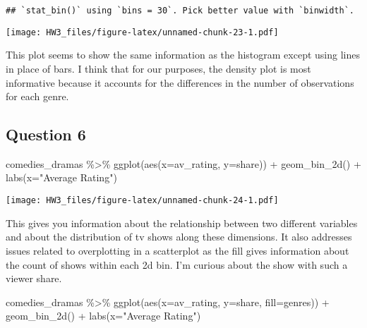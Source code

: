 \documentclass[
]{article}
\newenvironment{Shaded}{\begin{snugshade}}{\end{snugshade}}
\newcommand{\AttributeTok}[1]{\textcolor[rgb]{0.77,0.63,0.00}{#1}}
\newcommand{\FunctionTok}[1]{\textcolor[rgb]{0.00,0.00,0.00}{#1}}
\newcommand{\NormalTok}[1]{#1}
\newcommand{\SpecialCharTok}[1]{\textcolor[rgb]{0.00,0.00,0.00}{#1}}
\newcommand{\StringTok}[1]{\textcolor[rgb]{0.31,0.60,0.02}{#1}}
\begin{document}
\begin{verbatim}
## `stat_bin()` using `bins = 30`. Pick better value with `binwidth`.
\end{verbatim}

\texttt{[image: HW3\_files/figure-latex/unnamed-chunk-23-1.pdf]}

This plot seems to show the same information as the histogram except
using lines in place of bars. I think that for our purposes, the density
plot is most informative because it accounts for the differences in the
number of observations for each genre.

\hypertarget{question-6-1}{%
\subsection{Question 6}\label{question-6-1}}

\begin{Shaded}
\begin{Highlighting}[]
\NormalTok{comedies\_dramas }\SpecialCharTok{\%\textgreater{}\%} 
  \FunctionTok{ggplot}\NormalTok{(}\FunctionTok{aes}\NormalTok{(}\AttributeTok{x=}\NormalTok{av\_rating, }\AttributeTok{y=}\NormalTok{share)) }\SpecialCharTok{+}
  \FunctionTok{geom\_bin\_2d}\NormalTok{() }\SpecialCharTok{+} 
  \FunctionTok{labs}\NormalTok{(}\AttributeTok{x=}\StringTok{"Average Rating"}\NormalTok{)}
\end{Highlighting}
\end{Shaded}

\texttt{[image: HW3\_files/figure-latex/unnamed-chunk-24-1.pdf]}

This gives you information about the relationship between two different
variables and about the distribution of tv shows along these dimensions.
It also addresses issues related to overplotting in a scatterplot as the
fill gives information about the count of shows within each 2d bin. I'm
curious about the show with such a viewer share.

\begin{Shaded}
\begin{Highlighting}[]
\NormalTok{comedies\_dramas }\SpecialCharTok{\%\textgreater{}\%} 
  \FunctionTok{ggplot}\NormalTok{(}\FunctionTok{aes}\NormalTok{(}\AttributeTok{x=}\NormalTok{av\_rating, }\AttributeTok{y=}\NormalTok{share, }\AttributeTok{fill=}\NormalTok{genres)) }\SpecialCharTok{+}
  \FunctionTok{geom\_bin\_2d}\NormalTok{() }\SpecialCharTok{+}
  \FunctionTok{labs}\NormalTok{(}\AttributeTok{x=}\StringTok{"Average Rating"}\NormalTok{)}
\end{Highlighting}
\end{Shaded}
\end{document}
